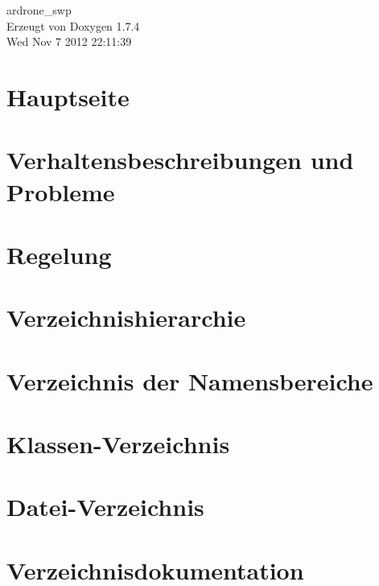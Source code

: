 \documentclass[a4paper]{book}
\begin{document}
\hypersetup{pageanchor=false}
\begin{titlepage}
\vspace*{7cm}
\begin{center}
{\Large ardrone\_\-swp }\\
\vspace*{1cm}
{\large Erzeugt von Doxygen 1.7.4}\\
\vspace*{0.5cm}
{\small Wed Nov 7 2012 22:11:39}\\
\end{center}
\end{titlepage}
\clearemptydoublepage
{}
\tableofcontents
\clearemptydoublepage
{}
\hypersetup{pageanchor=true}
\chapter{Hauptseite}
\label{index}\hypertarget{index}{}
\chapter{Verhaltensbeschreibungen und Probleme}
\label{page2}
\hypertarget{page2}{}

\chapter{Regelung}
\label{page1}
\hypertarget{page1}{}

\chapter{Verzeichnishierarchie}

\chapter{Verzeichnis der Namensbereiche}

\chapter{Klassen-\/Verzeichnis}

\chapter{Datei-\/Verzeichnis}

\chapter{Verzeichnisdokumentation}



\end{document}
